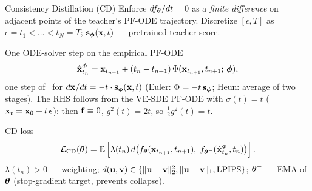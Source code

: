 \documentclass{beamer}
\begin{document}
\begin{frame}{Consistency Distillation (CD)}
	Enforce $df_{\boldsymbol{\theta}}/dt = 0$ as a \emph{finite difference} on adjacent points of the teacher's PF-ODE trajectory. Discretize $[\epsilon, T]$ as $\epsilon = t_1 < \dots < t_N = T$; $\mathbf{s}_{\boldsymbol{\phi}}(\mathbf{x}, t)$ --- pretrained teacher score.
	\eqpause
	\begin{block}{One ODE-solver step on the empirical PF-ODE}
		\vspace{-0.3cm}
		\[
			\hat{\mathbf{x}}_{t_n}^{\boldsymbol{\phi}} = \mathbf{x}_{t_{n+1}} + (t_n - t_{n+1})\, \Phi(\mathbf{x}_{t_{n+1}}, t_{n+1};\, \boldsymbol{\phi}),
		\]
		one step of \ODESolve\ for $d\mathbf{x}/dt = -t \cdot \mathbf{s}_{\boldsymbol{\phi}}(\mathbf{x}, t)$ (Euler: $\Phi = -t\, \mathbf{s}_{\boldsymbol{\phi}}$; Heun: average of two stages). The RHS follows from the VE-SDE PF-ODE with $\sigma(t) = t$ ($\mathbf{x}_t = \mathbf{x}_0 + t\,\boldsymbol{\epsilon}$): then $\mathbf{f} \equiv 0$, $g^2(t) = 2t$, so $\tfrac{1}{2} g^2(t) = t$.
	\end{block}
	\eqpause
	\begin{block}{CD loss}
		\vspace{-0.4cm}
		\[
			\mathcal{L}_{\text{CD}}(\boldsymbol{\theta}) = \mathbb{E} \left[\lambda(t_n)\, d\bigl(f_{\boldsymbol{\theta}}(\mathbf{x}_{t_{n+1}}, t_{n+1}),\; f_{\boldsymbol{\theta}^-}(\hat{\mathbf{x}}_{t_n}^{\boldsymbol{\phi}}, t_n)\bigr)\right].
		\]
		$\lambda(t_n) > 0$ --- weighting; $d(\mathbf{u}, \mathbf{v}) \in \{\|\mathbf{u} - \mathbf{v}\|_2^2, \|\mathbf{u} - \mathbf{v}\|_1, \text{LPIPS}\}$; $\boldsymbol{\theta}^-$ --- EMA of $\boldsymbol{\theta}$ (stop-gradient target, prevents collapse).
	\end{block}
\end{frame}
\end{document}
